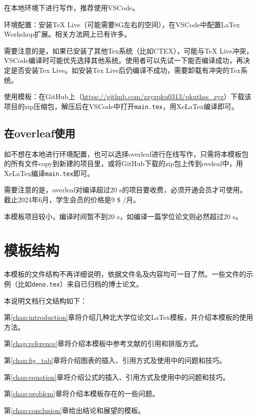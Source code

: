 在本地环境下进行写作，推荐使用VSCode。

环境配置：安装TeX Live（可能需要8G左右的空间），在VSCode中配置LaTex Workshop扩展。相关方法网上已有许多。

需要注意的是，如果已安装了其他Tex系统（比如CTEX），可能与TeX Live冲突，VSCode编译时可能优先选择其他系统。使用者可以先试一下能否编译成功，再决定是否安装Tex Live。如安装Tex Live后仍编译不成功，需要卸载有冲突的Tex系统。

使用模板：在GitHub上（\url{https://github.com/zzyzpku0313/pkuthss_zyz}）下载该项目的zip压缩包，解压后在VSCode中打开\texttt{main.tex}，用XeLaTex编译即可。

\subsection{在overleaf使用}

如不想在本地进行环境配置，也可以选择overleaf进行在线写作，只需将本模板包的所有文件copy到新建的项目里，或将GitHub下载的zip包上传到oveleaf中，用XeLaTex编译\texttt{main.tex}即可。

需要注意的是，overleaf对编译超过20 s的项目要收费，必须开通会员才可使用。截止2024年6月，学生会员的价格是9 $\$$ /月。

本模板项目较小，编译时间暂不到20 s，如编译一篇学位论文则必然超过20 s。

\section{模板结构}

本模板的文件结构不再详细说明，依据文件名及内容均可一目了然。一些文件的示例（比如\texttt{deno.tex}）来自已归档的博士论文。

本说明文档行文结构如下：

第\ref{chap:introduction}章将介绍几种北大学位论文LaTex模板，并介绍本模板的使用方法。

第\ref{chap:reference}章将介绍本模板中参考文献的引用和排版方式。

第\ref{chap:fig_tab}章将介绍图表的插入、引用方式及使用中的问题和技巧。

第\ref{chap:equation}章将介绍公式的插入、引用方式及使用中的问题和技巧。

第\ref{chap:problem}章将介绍本模板存在的一些问题。

第\ref{chap:conclusion}章给出结论和展望的模板。
